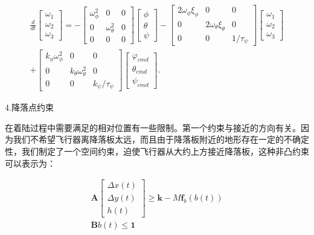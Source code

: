 $$
\begin{aligned}
\frac{d}{d t}\left[\begin{array}{l}
\omega_{1} \\
\omega_{2} \\
\omega_{3}
\end{array}\right]=-\left[\begin{array}{ccc}
\omega_{\phi}^{2} & 0 & 0 \\
0 & \omega_{\theta}^{2} & 0 \\
0 & 0 & 0
\end{array}\right]\left[\begin{array}{l}
\phi \\
\theta \\
\psi
\end{array}\right]-\left[\begin{array}{ccc}
2 \omega_{\phi} \xi_{\phi} & 0 & 0 \\
0 & 2 \omega_{\theta} \xi_{\theta} & 0 \\
0 & 0 & 1 / \tau_{\psi}
\end{array}\right]\left[\begin{array}{l}
\omega_{1} \\
\omega_{2} \\
\omega_{3}
\end{array}\right] \\
+ {\left[\begin{array}{ccc}
k_{\phi} \omega_{\phi}^{2} & 0 & 0 \\
0 & k_{\theta} \omega_{\theta}^{2} & 0 \\
0 & 0 & k_{\psi} / \tau_{\psi}
\end{array}\right]\left[\begin{array}{c}
\varphi_{c m d} \\
\theta_{c m d} \\
\psi_{c m d}
\end{array}\right] . }
\end{aligned}
$$

4.降落点约束

在着陆过程中需要满足的相对位置有一些限制。第一个约束与接近的方向有关。因为我们不希望飞行器离降落板太远，而且由于降落板附近的地形存在一定的不确定性，我们制定了一个空间约束，迫使飞行器从大约上方接近降落板，这种非凸约束可以表示为：

$$
\begin{array}{r}
\boldsymbol{A}\left[\begin{array}{c}
\Delta x(t) \\
\Delta y(t) \\
h(t)
\end{array}\right] \geq \boldsymbol{k}-M \boldsymbol{f}_{b}(b(t)) \\
\boldsymbol{B} b(t) \leq \mathbf{1}
\end{array}
$$

